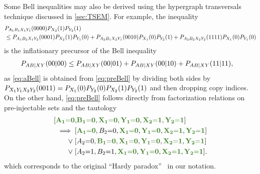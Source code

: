 \documentclass[aps,english,superscriptaddress,onecolumn,twoside,longbibliography,pra,floatfix,fleqn,nofootinbib]{revtex4-1}%
\newcommand*{\mgreen}[1]{{\color{OliveGreen}{\mathbf{#1}}}}
\theoremstyle{definition}
\newcounter{example}[section]
\newcommand{\p}[2][]{{P_{#1}}\parenths{#2}}
\newcommand{\cramp}[1]{\ensuremath{\mathord{#1}}}
\newcommand{\eql}{\cramp{=}}
\DeclarePairedDelimiter{\parenths}{\lparen}{\rparen}
\begin{document}
Some Bell inequalities may also be derived using the hypergraph transversals technique discussed in \cref{sec:TSEM}. For example, the inequality
\begin{align}\label{eq:preBell}\begin{split}
& \p[A_1 B_1 X_1 Y_1]{0000}\p[X_2]{1} \p[Y_2]{1} \\
&\leq
 \p[A_1 B_2 X_1 Y_2]{0001}\p[X_2]{1} \p[Y_1]{0} +\p[A_2 B_1 X_2 Y_1]{0010}\p[X_1]{0}\p[Y_2]{1}+  \p[A_2 B_2 X_2 Y_2]{1111}\p[X_1]{0} \p[Y_1]{0}
\end{split}\end{align}
is the inflationary precursor of the Bell inequality
\begin{align}\label{eq:aBell}
 \p[A B | X Y]{00|00} &\leq \p[A B | X Y]{00|01} +\p[A B | X Y]{00|10}+  \p[A B | X Y]{11|11},
\end{align}
as \cref{eq:aBell} is obtained from \cref{eq:preBell} by dividing both sides by $\p[X_1 Y_1 X_2 Y_2]{0011}=\p[X_1]{0} \p[Y_2]{0}\p[X_2]{1} \p[Y_2]{1}$ and then dropping copy indices. On the other hand, \cref{eq:preBell} follows directly from factorization relations on pre-injectable sets and the tautology
\begin{align}\begin{split}
	[ \mgreen{A_1 \eql 0}, & \mgreen{B_1 \eql 0}, \mgreen{X_1 \eql 0}, \mgreen{Y_1\eql 0}, \mgreen{X_2 \eql 1}, \mgreen{Y_2 \eql 1}]\\
 \implies 
	[ & \mgreen{A_1 \eql 0}, B_2 \eql 0, \mgreen{X_1 \eql 0}, \mgreen{Y_1\eql 0}, \mgreen{X_2 \eql 1}, \mgreen{Y_2 \eql 1}] \\
	\mathrel{\lor} [ & A_2 \eql 0, \mgreen{B_1 \eql 0}, \mgreen{X_1 \eql 0}, \mgreen{Y_1\eql 0}, \mgreen{X_2 \eql 1}, \mgreen{Y_2 \eql 1}] \\
	\mathrel{\lor} [ & A_2 \eql 1, B_2 \eql 1, \mgreen{X_1 \eql 0}, \mgreen{Y_1\eql 0}, \mgreen{X_2 \eql 1}, \mgreen{Y_2 \eql 1}].
\end{split}\end{align}
which corresponds to the original ``Hardy paradox''~\cite{L.Hardy:PRL:1665} in our notation.




\renewcommand\section{\stdsection}
\let\cleardoublepage\clearpage
\setlength{\bibsep}{3pt plus 3pt minus 2pt}

\nocite{apsrev41Control}

\end{document}
